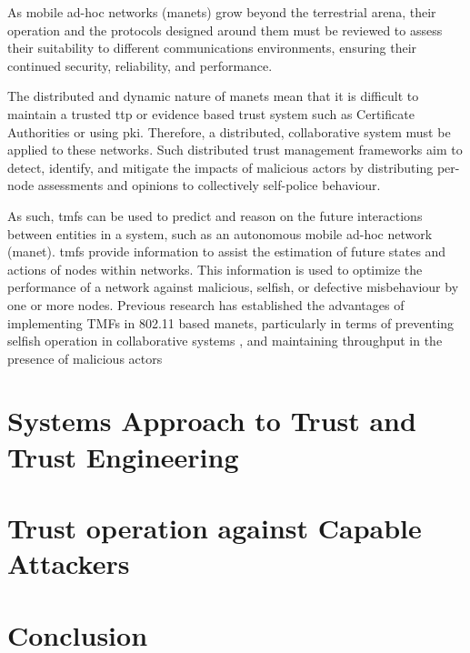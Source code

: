 As mobile ad-hoc networks (\gls{manet}s) grow beyond the terrestrial arena, their operation and the protocols designed around them must be reviewed to assess their suitability to different communications environments, ensuring their continued security, reliability, and performance.

The distributed and dynamic nature of \glspl{manet} mean that it is difficult to maintain a trusted \gls{ttp} or evidence based trust system such as Certificate Authorities or using \gls{pki}.
Therefore, a distributed, collaborative system must be applied to these networks.
Such distributed trust management frameworks aim to detect, identify, and mitigate the impacts of malicious actors by distributing per-node assessments and opinions to collectively self-police behaviour.

As such, \glspl{tmf} can be used to predict and reason on the future interactions between entities in a system, such as an autonomous mobile ad-hoc network (\gls{manet}).
\glspl{tmf} provide information to assist the estimation of future states and actions of nodes within networks.
This information is used to optimize the performance of a network against malicious, selfish, or defective misbehaviour by one or more nodes.
Previous research has established the advantages of implementing TMFs in 802.11 based \glspl{manet}, particularly in terms of preventing selfish operation in collaborative systems \cite{Li2007}, and maintaining throughput in the presence of malicious actors \cite{Buchegger2002}

\section{Systems Approach to Trust and Trust Engineering}

\section{Trust operation against Capable Attackers}



\section{Conclusion}

\ifx\ifthesis\undefined
	
\fi
